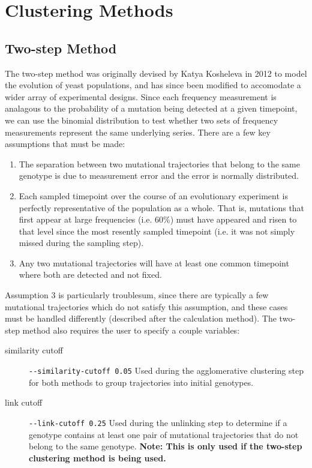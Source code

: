 \documentclass{report}
\begin{document}
\chapter{Clustering Methods}

\section{Two-step Method}
The two-step method was originally devised by Katya Kosheleva in 2012 to model the evolution of yeast populations, and has since been modified to accomodate a wider array of experimental designs. Since each frequency measurement is analagous to the probability of a mutation being detected at a given timepoint, we can use the binomial distribution to test whether two sets of frequency measurements represent the same underlying series. There are a few key assumptions that must be made:

\begin{enumerate}
\item The separation between two mutational trajectories that belong to the same genotype is due to measurement error and the error is normally distributed.
\item Each sampled timepoint over the course of an evolutionary experiment is perfectly representative of the population as a whole. That is, mutations that first appear at large frequencies (i.e. 60\%) must have appeared and risen to that level since the most resently sampled timepoint (i.e. it was not simply missed during the sampling step).
\item Any two mutational trajectories will have at least one common timepoint where both are detected and not fixed.
\end{enumerate}

Assumption 3 is particularly troublesum, since there are typically a few mutational trajectories which do not satisfy this assumption, and these cases must be handled differently (described after the calculation method).
The two-step method also requires the user to specify a couple variables:

\begin{description}
\item[similarity cutoff] \verb|--similarity-cutoff 0.05| Used during the agglomerative clustering step for both methods to group trajectories into initial genotypes.
\item[link cutoff] \verb|--link-cutoff 0.25| Used during the unlinking step to determine if a genotype contains at least one pair of mutational 
  trajectories that do not belong to the same genotype.
  \textbf{Note: This is only used if the two-step clustering method is being used.}
\end{description}
\end{document}
